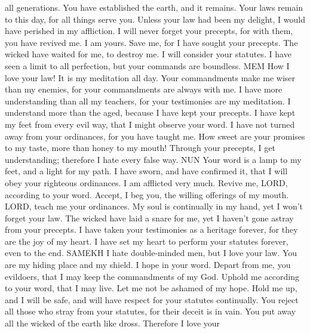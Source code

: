 all generations. You have established the earth, and it remains.
 Your laws remain to this day, for all things serve you.
 Unless your law had been my delight, I would have perished
in my affliction.  I will never forget your precepts, for
with them, you have revived me.  I am yours. Save me, for I
have sought your precepts.  The wicked have waited for me,
to destroy me. I will consider your statutes.  I have seen
a limit to all perfection, but your commands are boundless. MEM
 How I love your law! It is my meditation all day.
 Your commandments make me wiser than my enemies, for your
commandments are always with me.  I have more understanding
than all my teachers, for your testimonies are my meditation.
 I understand more than the aged, because I have kept your
precepts.  I have kept my feet from every evil way, that I
might observe your word.  I have not turned away from your
ordinances, for you have taught me.  How sweet are your
promises to my taste, more than honey to my mouth! 
Through your precepts, I get understanding; therefore I hate every false
way. NUN  Your word is a lamp to my feet, and a light for
my path.  I have sworn, and have confirmed it, that I will
obey your righteous ordinances.  I am afflicted very much.
Revive me, LORD, according to your word.  Accept, I beg
you, the willing offerings of my mouth. LORD, teach me your ordinances.
 My soul is continually in my hand, yet I won't forget
your law.  The wicked have laid a snare for me, yet I
haven't gone astray from your precepts.  I have taken your
testimonies as a heritage forever, for they are the joy of my heart.
 I have set my heart to perform your statutes forever,
even to the end. SAMEKH  I hate double-minded men, but I
love your law.  You are my hiding place and my shield. I
hope in your word.  Depart from me, you evildoers, that I
may keep the commandments of my God.  Uphold me according
to your word, that I may live. Let me not be ashamed of my hope.
 Hold me up, and I will be safe, and will have respect for
your statutes continually.  You reject all those who stray
from your statutes, for their deceit is in vain.  You put
away all the wicked of the earth like dross. Therefore I love your
